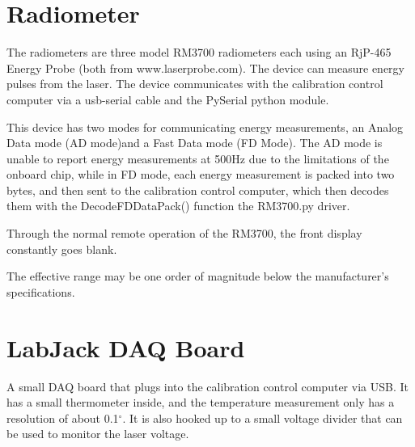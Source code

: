 \section{Radiometer}\label{app:radiometers}
The radiometers are three model RM3700 radiometers each using an RjP-465 Energy Probe (both from www.laserprobe.com).
The device can measure energy pulses from the laser.
The device communicates with the calibration control computer via a usb-serial cable and the PySerial python module.  

This device has two modes for communicating energy measurements, an Analog Data mode (AD mode)and a Fast Data mode (FD Mode).  The AD mode is unable to report energy measurements at 500Hz due to the limitations of the onboard chip, while in FD mode, each energy measurement is packed into two bytes, and then sent to the calibration control computer, which then decodes them with the DecodeFDDataPack() function the RM3700.py driver.

Through the normal remote operation of the RM3700, the front display constantly goes blank.

The effective range may be one order of magnitude below the manufacturer’s specifications.

\section{LabJack DAQ Board}
A small DAQ board that plugs into the calibration control computer via USB.
It has a small thermometer inside, and the temperature measurement only has a resolution of about 0.1${}^\circ$.
It is also hooked up to a small voltage divider that can be used to monitor the laser voltage.

